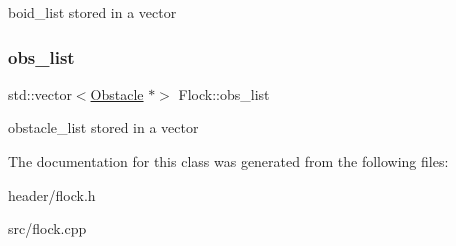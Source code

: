 boid\+\_\+list stored in a vector \mbox{\label{class_flock_a3119c5a155c620f89111b7d6e1121b9f}} 
\subsubsection{\texorpdfstring{obs\+\_\+list}{obs\_list}}
{\footnotesize\ttfamily std\+::vector$<$\mbox{\hyperlink{class_obstacle}{Obstacle}} $\ast$$>$ Flock\+::obs\+\_\+list}

obstacle\+\_\+list stored in a vector 

The documentation for this class was generated from the following files\+:\begin{DoxyCompactItemize}
\item 
header/flock.\+h\item 
src/flock.\+cpp\end{DoxyCompactItemize}
